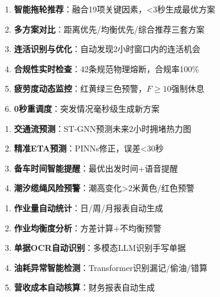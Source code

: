 \documentclass[12pt,a4paper]{article}
\begin{document}
\begin{tcolorbox}[colback=blue!5!white,colframe=blue!75!black,title=\textbf{A. 智能调度核心功能（6项）}]
\begin{enumerate}[leftmargin=*, itemsep=5pt]
    \item \textbf{智能拖轮推荐}：融合19项关键因素，<3秒生成最优方案
    \item \textbf{多方案对比}：距离优先/均衡优先/综合推荐三套方案
    \item \textbf{连活识别与优化}：自动发现2小时窗口内的连活机会
    \item \textbf{合规性实时检查}：42条规范物理熔断，合规率100\%
    \item \textbf{疲劳度动态监控}：红黄绿三色预警，$F\geq10$强制休息
    \item \textbf{0秒重调度}：突发情况毫秒级生成新方案
\end{enumerate}
\end{tcolorbox}

\vspace{0.3cm}

\begin{tcolorbox}[colback=green!5!white,colframe=green!75!black,title=\textbf{B. 预测与感知功能（4项）}]
\begin{enumerate}[leftmargin=*, itemsep=5pt]
    \item \textbf{交通流预测}：ST-GNN预测未来2小时拥堵热力图
    \item \textbf{精准ETA预测}：PINNs修正，误差<30秒
    \item \textbf{备车时间智能提醒}：最优出发时间+语音提醒
    \item \textbf{潮汐缆绳风险预警}：潮高变化>2米黄色/红色预警
\end{enumerate}
\end{tcolorbox}

\vspace{0.3cm}

\begin{tcolorbox}[colback=yellow!5!white,colframe=yellow!75!black,title=\textbf{C. 数据分析与统计功能（5项）}]
\begin{enumerate}[leftmargin=*, itemsep=5pt]
    \item \textbf{作业量自动统计}：日/周/月报表自动生成
    \item \textbf{作业均衡度分析}：方差计算+不均衡预警
    \item \textbf{单据OCR自动识别}：多模态LLM识别手写单据
    \item \textbf{油耗异常智能检测}：Transformer识别漏记/偷油/错算
    \item \textbf{营收成本自动核算}：财务报表自动生成
\end{enumerate}
\end{tcolorbox}
\end{document}
